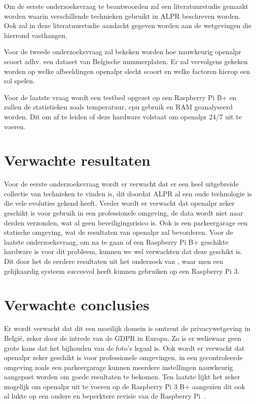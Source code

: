Om de eerste onderzoeksvraag te beantwoorden zal een literatuurstudie gemaakt worden waarin verschillende technieken gebruikt in ALPR beschreven worden. Ook zal in deze literatuurstudie aandacht gegeven worden aan de wetgevingen die hierrond vasthangen. 

Voor de tweede onderzoeksvraag zal bekeken worden hoe nauwkeurig openalpr scoort adhv. een dataset van Belgische nummerplaten. Er zal vervolgens gekeken worden op welke afbeeldingen openalpr slecht scoort en welke factoren hierop een rol spelen.

Voor de laatste vraag wordt een testbed opgezet op een Raspberry Pi B+ en zullen de statistieken zoals temperatuur, cpu gebruik en RAM geanalyseerd worden. Dit om af te leiden of deze hardware volstaat om openalpr 24/7 uit te voeren.

\section{Verwachte resultaten}
\label{sec:verwachte_resultaten}

Voor de eerste onderzoeksvraag wordt er verwacht dat er een heel uitgebreide collectie van technieken te vinden is, dit doordat ALPR al een oude technologie is die vele evoluties gekend heeft.
Verder wordt er verwacht dat openalpr zeker geschikt is voor gebruik in een professionele omgeving, de data wordt niet naar derden verzonden, wat al geen beveiligingsrisico is. Ook is een parkeergarage een statische omgeving, wat de resultaten van openalpr zal bevorderen. Voor de laatste onderzoeksvraag, om na te gaan of een Raspberry Pi B+ geschikte hardware is voor dit probleem, kunnen we wel verwachten dat deze geschikt is. Dit door het de eerdere resultaten uit het onderzoek van \citeauthor{buhus2016automatic}, waar men een gelijkaardig systeem succesvol heeft kunnen gebruiken op een Raspberry Pi 3.

\section{Verwachte conclusies}
\label{sec:verwachte_conclusies}

Er wordt verwacht dat dit een moeilijk domein is omtrent de privacywetgeving in België, zeker door de intrede van de GDPR in Europa. Zo is er weliswaar geen grote kans dat het bijhouden van de foto's legaal is. 
Ook wordt er verwacht dat openalpr zeker geschikt is voor professionele omgevingen, in een gecontroleerde omgeving zoals een parkeergarage kunnen meerdere instellingen nauwkeurig aangepast worden om goede resultaten te bekomen. Ten laatste lijkt het zeker mogelijk om openalpr uit te voeren op de Raspberry Pi 3 B+ aangezien dit ook al lukte op een oudere en beperktere revisie van de Raspberry Pi~\autocite{buhus2016automatic}.